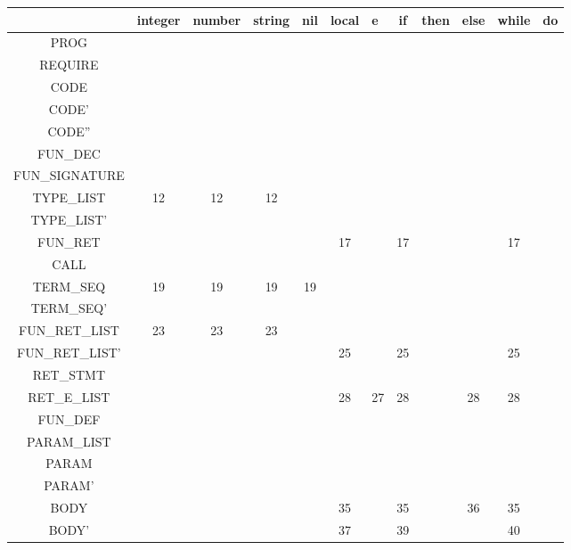 \documentclass[11pt,a4paper]{article}
\begin{document}
    \begin{table}
        \begin{tabular}{|c|c|c|c|c|c|l|c|c|c|c|c|}
        \hline
         & integer & number & string & nil & local & e & if & then & else & while & do \\ \hline
        PROG &  &  &  &  &  &  &  &  &  &  &  \\ \hline
        REQUIRE &  &  &  &  &  &  &  &  &  &  &  \\ \hline
        CODE &  &  &  &  &  &  &  &  &  &  &  \\ \hline
        CODE' &  &  &  &  &  &  &  &  &  &  &  \\ \hline
        CODE'' &  &  &  &  &  &  &  &  &  &  &  \\ \hline
        FUN\_DEC &  &  &  &  &  &  &  &  &  &  &  \\ \hline
        FUN\_SIGNATURE &  &  &  &  &  &  &  &  &  &  &  \\ \hline
        TYPE\_LIST & 12 & 12 & 12 &  &  &  &  &  &  &  &  \\ \hline
        TYPE\_LIST' &  &  &  &  &  &  &  &  &  &  &  \\ \hline
        FUN\_RET &  &  &  &  & 17 &  & 17 &  &  & 17 &  \\ \hline
        CALL &  &  &  &  &  &  &  &  &  &  &  \\ \hline
        TERM\_SEQ & 19 & 19 & 19 & 19 &  &  &  &  &  &  &  \\ \hline
        TERM\_SEQ' &  &  &  &  &  &  &  &  &  &  &  \\ \hline
        FUN\_RET\_LIST & 23 & 23 & 23 &  &  &  &  &  &  &  &  \\ \hline
        FUN\_RET\_LIST' &  &  &  &  & 25 &  & 25 &  &  & 25 &  \\ \hline
        RET\_STMT &  &  &  &  &  &  &  &  &  &  &  \\ \hline
        RET\_E\_LIST &  &  &  &  & 28 & 27 & 28 &  & 28 & 28 &  \\ \hline
        FUN\_DEF &  &  &  &  &  &  &  &  &  &  &  \\ \hline
        PARAM\_LIST &  &  &  &  &  &  &  &  &  &  &  \\ \hline
        PARAM &  &  &  &  &  &  &  &  &  &  &  \\ \hline
        PARAM' &  &  &  &  &  &  &  &  &  &  &  \\ \hline
        BODY &  &  &  &  & 35 &  & 35 &  & 36 & 35 &  \\ \hline
        BODY' &  &  &  &  & 37 &  & 39 &  &  & 40 &  \\ \hline

\end{tabular}
\end{table}
\end{document}
